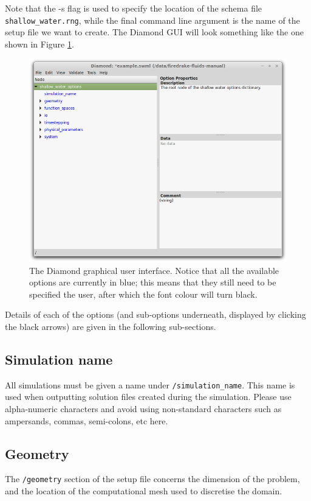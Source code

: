 \documentclass[a4paper,11pt]{report}
\begin{document}
Note that the -s flag is used to specify the location of the schema file \texttt{shallow\_water.rng}, while the final command line argument is the name of the setup file we want to create. The Diamond GUI will look something like the one shown in Figure \ref{fig:diamond}.

\begin{figure}[!ht]
   \centering
   \includegraphics[width=1\columnwidth]{images/diamond.png}
   \caption{The Diamond \citep{Ham_etal_2009} graphical user interface. Notice that all the available options are currently in blue; this means that they still need to be specified the user, after which the font colour will turn black.}
   \label{fig:diamond}
\end{figure}

Details of each of the options (and sub-options underneath, displayed by clicking the black arrows) are given in the following sub-sections.

\subsection{Simulation name}
All simulations must be given a name under \texttt{/simulation\_name}. This name is used when outputting solution files created during the simulation. Please use alpha-numeric characters and avoid using non-standard characters such as ampersands, commas, semi-colons, etc here.

\subsection{Geometry}
The \texttt{/geometry} section of the setup file concerns the dimension of the problem, and the location of the computational mesh used to discretise the domain.
\end{document}
